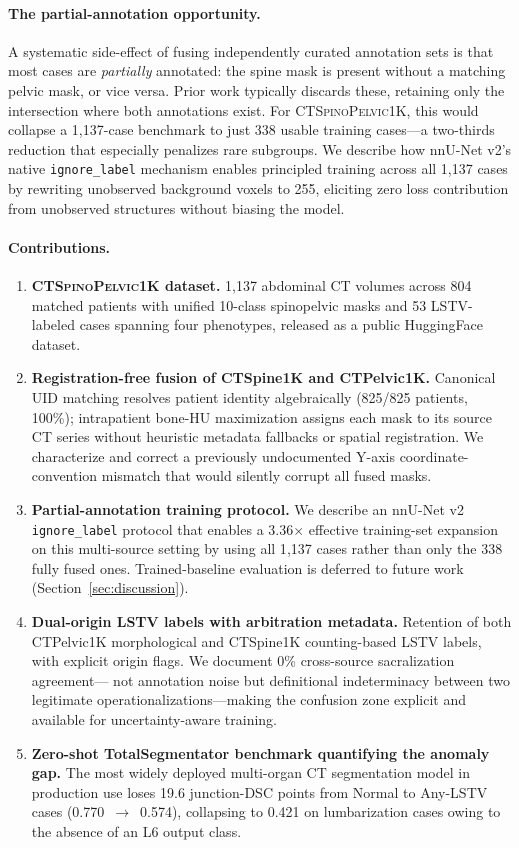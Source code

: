 \documentclass[pmlr]{jmlr}
\newcommand{\dataset}{\textsc{CTSpinoPelvic1K}}
\begin{document}
\paragraph{The partial-annotation opportunity.}
A systematic side-effect of fusing independently curated annotation
sets is that most cases are \emph{partially} annotated: the spine
mask is present without a matching pelvic mask, or vice versa.
Prior work typically discards these, retaining only the intersection
where both annotations exist.
For \dataset{}, this would collapse a 1{,}137-case benchmark to just
338 usable training cases---a two-thirds reduction that especially
penalizes rare subgroups.
We describe how nnU-Net v2's native \texttt{ignore\_label} mechanism
enables principled training across all 1{,}137 cases by rewriting
unobserved background voxels to 255, eliciting zero loss contribution
from unobserved structures without biasing the model.

\paragraph{Contributions.}
\begin{enumerate}
  \item \textbf{\dataset{} dataset.} 1{,}137 abdominal CT volumes
    across 804 matched patients with unified 10-class spinopelvic
    masks and 53 LSTV-labeled cases spanning four phenotypes,
    released as a public HuggingFace dataset.
  \item \textbf{Registration-free fusion of CTSpine1K and
    CTPelvic1K.} Canonical UID matching resolves patient identity
    algebraically (825/825 patients, 100\%); intrapatient bone-HU
    maximization assigns each mask to its source CT series without
    heuristic metadata fallbacks or spatial registration.
    We characterize and correct a previously undocumented Y-axis
    coordinate-convention mismatch that would silently corrupt all
    fused masks.
  \item \textbf{Partial-annotation training protocol.}
    We describe an nnU-Net v2 \texttt{ignore\_label} protocol that
    enables a 3.36$\times$ effective training-set expansion on this
    multi-source setting by using all 1{,}137 cases rather than
    only the 338 fully fused ones. Trained-baseline evaluation is
    deferred to future work (Section~\ref{sec:discussion}).
  \item \textbf{Dual-origin LSTV labels with arbitration
    metadata.} Retention of both CTPelvic1K morphological and
    CTSpine1K counting-based LSTV labels, with explicit origin
    flags. We document 0\% cross-source sacralization agreement---
    not annotation noise but definitional indeterminacy between
    two legitimate operationalizations---making the confusion zone
    explicit and available for uncertainty-aware training.
  \item \textbf{Zero-shot TotalSegmentator benchmark quantifying
    the anomaly gap.} The most widely deployed multi-organ CT
    segmentation model in production use loses 19.6 junction-DSC
    points from Normal to Any-LSTV cases (0.770~$\rightarrow$~0.574),
    collapsing to 0.421 on lumbarization cases owing to the
    absence of an L6 output class.
\end{enumerate}
\end{document}
